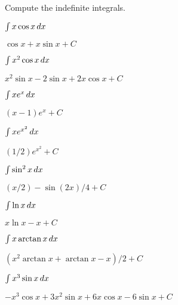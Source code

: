 \begin{exercises}
\noindent Compute the indefinite integrals.

\twocol

\begin{exercise} $\int x\cos x\, d x$
\begin{answer} $\cos x+x\sin x+C$
\end{answer}\end{exercise}

\begin{exercise} $\int x^2\cos x\, d x$
\begin{answer} $x^2\sin x-2 \sin x+2x\cos x +C$
\end{answer}\end{exercise}

\begin{exercise} $\int xe^x\, d x$
\begin{answer} $(x-1)e^x +C$
\end{answer}\end{exercise}

\begin{exercise} $\int xe^{x^2}\, d x$
\begin{answer} $(1/2)e^{x^2} +C$
\end{answer}\end{exercise}

\begin{exercise} $\int \sin^2 x\, d x$
\begin{answer} $(x/2)-\sin(2x)/4 +C$
\end{answer}\end{exercise}

\begin{exercise} $\int \ln x\, d x$
\begin{answer} $x\ln x-x +C$
\end{answer}\end{exercise}

\begin{exercise} $\int x\arctan x\, d x$
\begin{answer} $(x^2\arctan x +\arctan x -x)/2+C$
\end{answer}\end{exercise}

\begin{exercise} $\int x^3\sin x\, d x$
\begin{answer} $-x^3\cos x+3x^2\sin x+6x\cos x-6\sin x+C$
\end{answer}\end{exercise}


\end{exercises}
